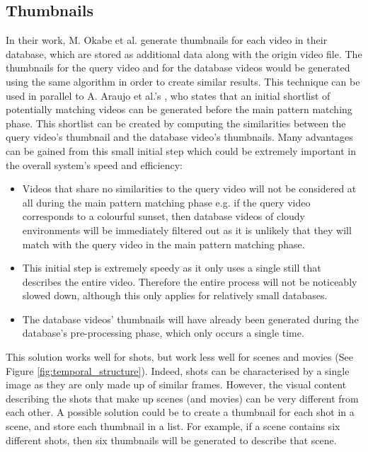 \documentclass[11pt,openany,a4paper]{article}
\begin{document}

\subsection{Thumbnails}
\label{sec:thumbnails}

In their work, M. Okabe et al. \cite{okabe2018animating} generate thumbnails for each video in their database, which are stored as additional data along with the origin video file. The thumbnails for the query video and for the database videos would be generated using the same algorithm in order to create similar results. This technique can be used in parallel to A. Araujo et al.'s \cite{araujo2017i2v}, who states that an initial shortlist of potentially matching videos can be generated before the main pattern matching phase. This shortlist can be created by computing the similarities between the query video's thumbnail and the database video's thumbnails. Many advantages can be gained from this small initial step which could be extremely important in the overall system's speed and efficiency:
\begin{itemize}
    \item Videos that share no similarities to the query video will not be considered at all during the main pattern matching phase e.g. if the query video corresponds to a colourful sunset, then database videos of cloudy environments will be immediately filtered out as it is unlikely that they will match with the query video in the main pattern matching phase.
    \item This initial step is extremely speedy as it only uses a single still that describes the entire video. Therefore the entire process will not be noticeably slowed down, although this only applies for relatively small databases.
    \item The database videos' thumbnails will have already been generated during the database's pre-processing phase, which only occurs a single time.
\end{itemize}

This solution works well for shots, but work less well for scenes and movies (See Figure \ref{fig:temporal_structure}). Indeed, shots can be characterised by a single image as they are only made up of similar frames. However, the visual content describing the shots that make up scenes (and movies) can be very different from each other. A possible solution could be to create a thumbnail for each shot in a scene, and store each thumbnail in a list. For example, if a scene contains six different shots, then six thumbnails will be generated to describe that scene.\\
\end{document}

